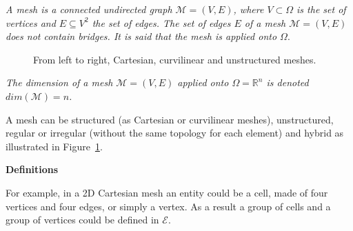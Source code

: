 \begin{mydef}
\textit{A mesh is a connected undirected graph $\mathcal{M}=(V,E)$, where $V\subset \Omega$ is the set of vertices and $E\subseteq V^2$ the set of edges. The set of edges $E$ of a mesh $\mathcal{M}=(V,E)$ does not contain bridges. It is said that the mesh is applied onto $\Omega$}.
\end{mydef}
\begin{figure}[!h]\begin{center}
  \caption{From left to right, Cartesian, curvilinear and unstructured meshes.}
  \label{fig:mesh}
\end{center}\end{figure}
\begin{mydef}
\textit{The dimension of a mesh $\mathcal{M}=(V,E)$ applied onto $\Omega=\mathbb{R}^n$ is denoted $dim(\mathcal{M})=n$.}
\end{mydef}
A mesh can be structured (as Cartesian or curvilinear meshes), unstructured, regular or irregular (without the same topology for each element) and hybrid as illustrated in Figure~\ref{fig:mesh}.

\medskip
\noindent \textbf{Definitions}

For example, in a 2D Cartesian mesh an entity could be a cell, made of four vertices and four edges, or simply a vertex. As a result a group of cells and a group of vertices could be defined in $\mathcal{E}$. %

